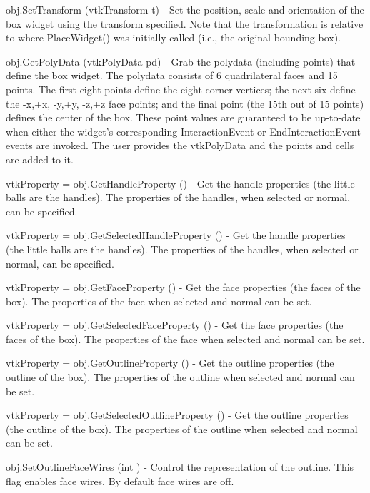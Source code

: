 \begin{DoxyItemize}
\item {\ttfamily obj.\-Set\-Transform (vtk\-Transform t)} -\/ Set the position, scale and orientation of the box widget using the transform specified. Note that the transformation is relative to where Place\-Widget() was initially called (i.\-e., the original bounding box).  
\item {\ttfamily obj.\-Get\-Poly\-Data (vtk\-Poly\-Data pd)} -\/ Grab the polydata (including points) that define the box widget. The polydata consists of 6 quadrilateral faces and 15 points. The first eight points define the eight corner vertices; the next six define the -\/x,+x, -\/y,+y, -\/z,+z face points; and the final point (the 15th out of 15 points) defines the center of the box. These point values are guaranteed to be up-\/to-\/date when either the widget's corresponding Interaction\-Event or End\-Interaction\-Event events are invoked. The user provides the vtk\-Poly\-Data and the points and cells are added to it.  
\item {\ttfamily vtk\-Property = obj.\-Get\-Handle\-Property ()} -\/ Get the handle properties (the little balls are the handles). The properties of the handles, when selected or normal, can be specified.  
\item {\ttfamily vtk\-Property = obj.\-Get\-Selected\-Handle\-Property ()} -\/ Get the handle properties (the little balls are the handles). The properties of the handles, when selected or normal, can be specified.  
\item {\ttfamily vtk\-Property = obj.\-Get\-Face\-Property ()} -\/ Get the face properties (the faces of the box). The properties of the face when selected and normal can be set.  
\item {\ttfamily vtk\-Property = obj.\-Get\-Selected\-Face\-Property ()} -\/ Get the face properties (the faces of the box). The properties of the face when selected and normal can be set.  
\item {\ttfamily vtk\-Property = obj.\-Get\-Outline\-Property ()} -\/ Get the outline properties (the outline of the box). The properties of the outline when selected and normal can be set.  
\item {\ttfamily vtk\-Property = obj.\-Get\-Selected\-Outline\-Property ()} -\/ Get the outline properties (the outline of the box). The properties of the outline when selected and normal can be set.  
\item {\ttfamily obj.\-Set\-Outline\-Face\-Wires (int )} -\/ Control the representation of the outline. This flag enables face wires. By default face wires are off.  

\end{DoxyItemize}
